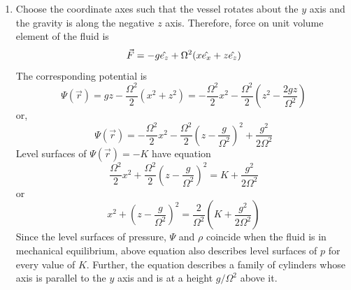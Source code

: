 \begin{enumerate}
\item Choose the coordinate axes such that the vessel rotates about the $y$ axis and the gravity is along the negative $z$ axis. Therefore, force on unit volume element of the fluid is
\[
\vec{F} = -g\hat{e_{z}} + \Omega^2(x\hat{e_{x}} + z\hat{e_{z}})
\]
The corresponding potential is
\[
\Psi(\vec{r}) = gz - \frac{\Omega^2}{2}(x^2 + z^2) = -\frac{\Omega^2}{2}x^2 - \frac{\Omega^2}{2}\left(z^2 - \frac{2gz}{\Omega^2}\right)
\]
or,
\[
\Psi(\vec{r}) = -\frac{\Omega^2}{2}x^2 - \frac{\Omega^2}{2}\left(z - \frac{g}{\Omega^2}\right)^2 + \frac{g^2}{2\Omega^2}
\]
Level surfaces of $\Psi(\vec{r}) = -K$ have equation
\[
\frac{\Omega^2}{2}x^2 + \frac{\Omega^2}{2}\left(z - \frac{g}{\Omega^2}\right)^2 = K + \frac{g^2}{2\Omega^2}
\]
or
\[
x^2 + \left(z - \frac{g}{\Omega^2}\right)^2 = \frac{2}{\Omega^2}\left(K + \frac{g^2}{2\Omega^2}\right)
\]
Since the level surfaces of pressure, $\Psi$ and $\rho$ coincide when the fluid is in mechanical equilibrium, above equation also describes level surfaces of $p$ for every value of $K$.
Further, the equation describes a family of cylinders whose axis is parallel to the $y$ axis and is at a height $g/\Omega^2$ above it.


\end{enumerate}
